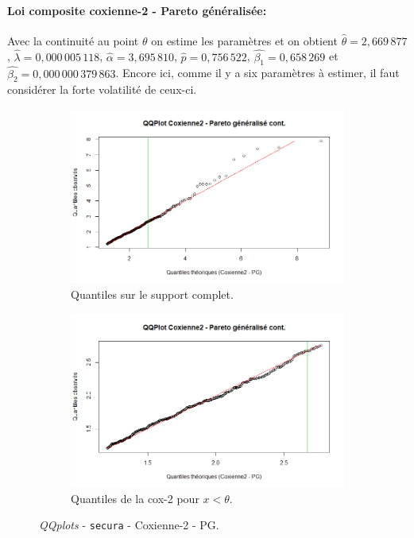 		\paragraph{Loi composite coxienne-2 - Pareto généralisée:} Avec la continuité au point $\theta$ on estime les paramètres et on obtient $\hat{\theta} =  2,669\,877$, $\hat{\lambda}=0,000\,005\,118$, $\hat{\alpha}= 3,695\,810$, $\hat{p} = 0,756\,522$, $\hat{\beta_1}=0,658\,269$ et $\hat{\beta_2}= 0,000\,000\,379\,863$. Encore ici, comme il y a six paramètres à estimer, il faut considérer la forte volatilité de ceux-ci.
		\begin{figure}[H]
			\begin{center}
				\begin{subfigure}[b]{0.45\textwidth}
					\includegraphics[scale=0.40]{Graphiques/QQ_Cox_PG_cont_secura} 
					\caption{Quantiles sur le support complet.} \label{QQplot_Cox_PG_con_sec}
				\end{subfigure}
				\begin{subfigure}[b]{0.4\textwidth}
					\includegraphics[scale=0.40]{Graphiques/QQ_Cox_PG_cont_t1_secura} 
					\caption{Quantiles de la cox-2 pour $x<\theta$.} \label{QQplot_Cox_PG_con_2_sec}
				\end{subfigure}
				\renewcommand{\figurename}{Illustration}
				\caption{\textit{QQplots} - \texttt{secura} - Coxienne-2 - PG.}
			\end{center}
		\end{figure}
	
